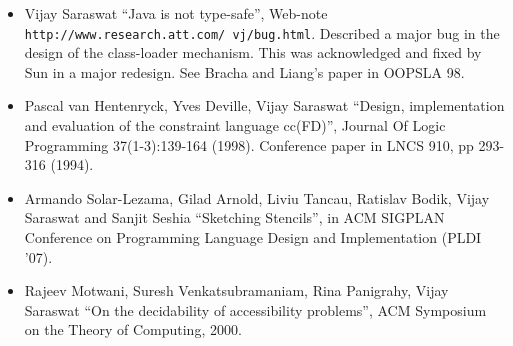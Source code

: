 \documentclass{article}
\begin{document}
\begin{itemize}
\item Vijay Saraswat ``Java is not type-safe'', Web-note
  \texttt{http://www.research.att.com/~vj/bug.html}. Described a major
  bug in the design of the class-loader mechanism. This was
  acknowledged and fixed by Sun in a major redesign. See Bracha and
  Liang's paper in OOPSLA 98.

\item Pascal van Hentenryck, Yves Deville, Vijay Saraswat ``Design,
    implementation and evaluation of the constraint language cc(FD)'',
    Journal Of Logic Programming 37(1-3):139-164 (1998). Conference
    paper in LNCS 910, pp 293-316 (1994).

\item Armando Solar-Lezama, Gilad Arnold, Liviu Tancau, Ratislav
Bodik, Vijay Saraswat and Sanjit Seshia ``Sketching Stencils'', in ACM
SIGPLAN Conference on Programming Language Design and Implementation
(PLDI '07).

\item   Rajeev Motwani, Suresh Venkatsubramaniam, Rina Panigrahy, Vijay
   Saraswat ``On the decidability of accessibility problems'', ACM
   Symposium on the Theory of Computing, 2000.

\end{itemize}
\end{document}
